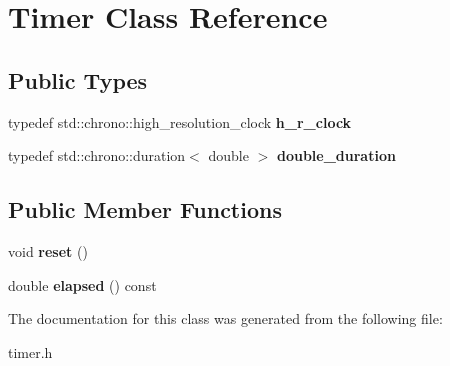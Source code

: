 \hypertarget{class_timer}{}\section{Timer Class Reference}
\label{class_timer}
\subsection*{Public Types}
\begin{DoxyCompactItemize}
\item 
\mbox{\label{class_timer_a7f479069d4a0e79ecf020f100ff85b6c}} 
typedef std\+::chrono\+::high\+\_\+resolution\+\_\+clock {\bfseries h\+\_\+r\+\_\+clock}
\item 
\mbox{\label{class_timer_adc9eceb48785cbc4e9a2b7112d642f71}} 
typedef std\+::chrono\+::duration$<$ double $>$ {\bfseries double\+\_\+duration}
\end{DoxyCompactItemize}
\subsection*{Public Member Functions}
\begin{DoxyCompactItemize}
\item 
\mbox{\label{class_timer_a9020542d73357a4eef512eefaf57524b}} 
void {\bfseries reset} ()
\item 
\mbox{\label{class_timer_a6a89a613c2af9b0d1e5f7e4ba9e46c54}} 
double {\bfseries elapsed} () const
\end{DoxyCompactItemize}


The documentation for this class was generated from the following file\+:\begin{DoxyCompactItemize}
\item 
timer.\+h\end{DoxyCompactItemize}
